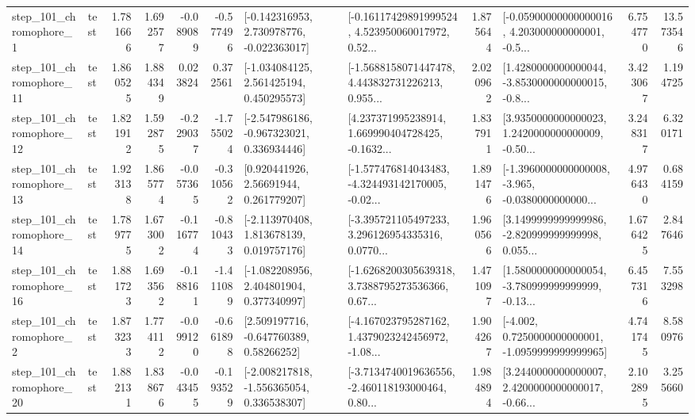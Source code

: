 \begin{tabular}{llrrrrllrlrr}
   step\_101\_chromophore\_1 &      test &      1.781666 &    1.692577 &     -0.089089 & -0.577496 &   [-0.142316953, 2.730978776, -0.022363017] &  [-0.16117429891999524, 4.523950060017972, 0.52... &       1.875644 &  [-0.05900000000000016, 4.203000000000001, -0.5... &            6.754770 &         13.573546 \\
  step\_101\_chromophore\_11 &      test &      1.860525 &    1.884349 &      0.023824 &  0.372561 &    [-1.034084125, 2.561425194, 0.450295573] &  [-1.5688158071447478, 4.443832731226213, 0.955... &       2.020962 &  [1.4280000000000044, -3.8530000000000015, -0.8... &            3.423067 &          1.194725 \\
  step\_101\_chromophore\_12 &      test &      1.821912 &    1.592875 &     -0.229037 & -1.755024 &   [-2.547986186, -0.967323021, 0.336934446] &  [4.237371995238914, 1.669990404728425, -0.1632... &       1.837911 &  [3.9350000000000023, 1.2420000000000009, -0.50... &            3.248317 &          6.320171 \\
  step\_101\_chromophore\_13 &      test &      1.923138 &    1.865774 &     -0.057365 & -0.310562 &      [0.920441926, 2.56691944, 0.261779207] &  [-1.577476814043483, -4.324493142170005, -0.02... &       1.891476 &  [-1.3960000000000008, -3.965, -0.0380000000000... &            4.976430 &          0.684159 \\
  step\_101\_chromophore\_14 &      test &      1.789775 &    1.673002 &     -0.116774 & -0.810433 &    [-2.113970408, 1.813678139, 0.019757176] &  [-3.395721105497233, 3.296126954335316, 0.0770... &       1.960566 &  [3.1499999999999986, -2.820999999999998, 0.055... &            1.676425 &          2.847646 \\
  step\_101\_chromophore\_16 &      test &      1.881723 &    1.693562 &     -0.188161 & -1.411089 &    [-1.082208956, 2.404801904, 0.377340997] &  [-1.6268200305639318, 3.7388795273536366, 0.67... &       1.471097 &  [1.5800000000000054, -3.780999999999999, -0.13... &            6.457316 &          7.553298 \\
   step\_101\_chromophore\_2 &      test &      1.873233 &    1.774112 &     -0.099120 & -0.661898 &     [2.509197716, -0.647760389, 0.58266252] &  [-4.167023795287162, 1.4379023242456972, -1.08... &       1.904267 &  [-4.002, 0.7250000000000001, -1.0959999999999965] &            4.741745 &          8.580976 \\
  step\_101\_chromophore\_20 &      test &      1.882131 &    1.838676 &     -0.043455 & -0.193529 &   [-2.008217818, -1.556365054, 0.336538307] &  [-3.7134740019636556, -2.460118193000464, 0.80... &       1.984894 &  [3.2440000000000007, 2.4200000000000017, -0.66... &            2.102895 &          3.255660 \\

\end{tabular}
